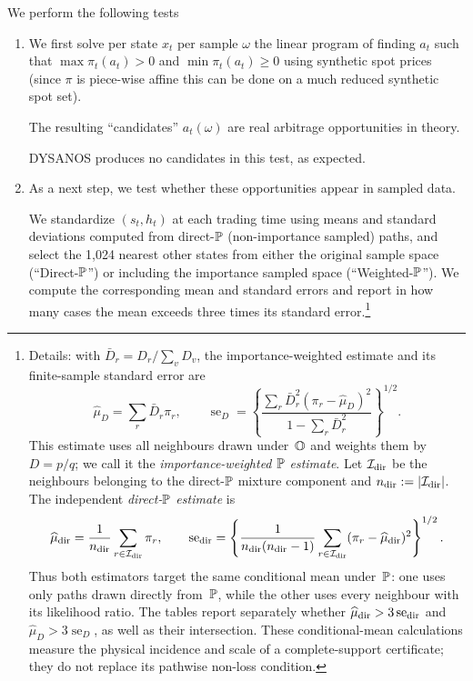 We perform the following tests
\begin{enumerate}
	\item We first solve per state $x_t$ per sample $\omega$ the linear program of finding $a_t$ such that $\max \pi_t(a_t) > 0$ and $\min \pi_t(a_t) \geq 0$
	using synthetic spot prices (since $\pi$ is piece-wise affine this can be done on a much reduced synthetic spot set). 
	
	The resulting ``candidates'' $a_t(\omega)$ are real arbitrage opportunities in theory.

DYSANOS produces no candidates in this test, as expected.
	
	\item As a next step, we test whether these opportunities appear in sampled data.

We standardize $(s_t,h_t)$ at each trading
time using means and standard deviations computed from direct-$\P$ (non-importance sampled) paths, and
select the 1,024 nearest other states from either the original sample space (``Direct-$\P$'') or including the importance sampled space (``Weighted-$\P$'').
We compute the corresponding mean and standard errors and report in how many cases the mean exceeds three times its standard error.\footnote{
Details: with
$\bar D_r=D_r/\sum_vD_v$, the importance-weighted estimate and its
finite-sample standard error are
\begin{equation}\label{eq:multi_expiry_weighted_mean}
 \widehat\mu_D=\sum_r\bar D_r\pi_r,
 \qquad
 \operatorname{se}_D
 =\left\{
   \frac{\sum_r\bar D_r^2(\pi_r-\widehat\mu_D)^2}
        {1-\sum_r\bar D_r^2}
   \right\}^{1/2}.
\end{equation}
This estimate uses all neighbours drawn under~$\O$ and weights them by
$D=p/q$; we call it the \emph{importance-weighted $\P$ estimate}. Let
$\mathcal I_{\rm dir}$ be the neighbours belonging to the direct-$\P$
mixture component and $n_{\rm dir}:=|\mathcal I_{\rm dir}|$. The independent
\emph{direct-$\P$ estimate} is
\begin{equation}\label{eq:multi_expiry_direct_mean}
 \widehat\mu_{\rm dir}
 =\frac{1}{n_{\rm dir}}\sum_{r\in\mathcal I_{\rm dir}}\pi_r,
 \qquad
 \operatorname{se}_{\rm dir}
 =\left\{
   \frac{1}{n_{\rm dir}(n_{\rm dir}-1)}
   \sum_{r\in\mathcal I_{\rm dir}}(\pi_r-\widehat\mu_{\rm dir})^2
  \right\}^{1/2}.
\end{equation}
Thus both estimators target the same conditional mean under~$\P$: one uses
only paths drawn directly from~$\P$, while the other uses every neighbour
with its likelihood ratio. The tables report separately whether
$\widehat\mu_{\rm dir}>3\operatorname{se}_{\rm dir}$ and
$\widehat\mu_D>3\operatorname{se}_D$, as well as their intersection. These
conditional-mean calculations measure the physical incidence and scale of a
complete-support certificate; they do not replace its pathwise non-loss
condition.

}
\end{enumerate}
